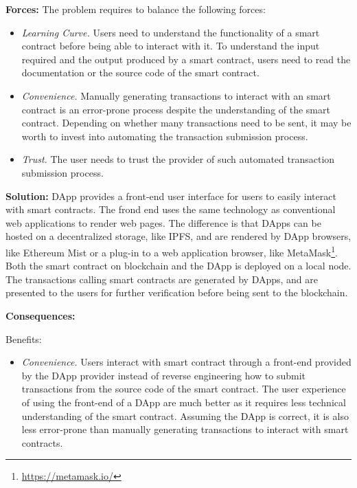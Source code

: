\vspace{0.5em}\noindent \textbf{Forces:} 
The problem requires to balance the following forces:
\begin{itemize}
  \item \textit{Learning Curve.} Users need to understand the functionality of a smart contract before being able to interact with it. To understand the input required and the output produced by a smart contract, users need to read the documentation or the source code of the smart contract. 
  \item \textit{Convenience.} Manually generating transactions to interact with an smart contract is an error-prone process despite the understanding of the smart contract. Depending on whether many transactions need to be sent, it may be worth to invest into automating the transaction submission process.
  \item \textit{Trust.} The user needs to trust the provider of such automated transaction submission process.  
\end{itemize}

\vspace{0.5em}\noindent \textbf{Solution:} 
DApp provides a front-end user interface for users to easily interact with smart contracts. The frond end uses the same technology as conventional web applications to render web pages. The difference is that DApps can be hosted on a decentralized storage, like IPFS, and are rendered by DApp browsers, like Ethereum Mist or a plug-in to a web application browser, like MetaMask\footnote{\url{https://metamask.io/}}. Both the smart contract on blockchain and the DApp is deployed on a local node.  The transactions calling smart contracts are generated by DApps, and are presented to the users for further verification before being sent to the blockchain.  


\vspace{0.5em}\noindent \textbf{Consequences:} 

Benefits:
\begin{itemize}
  \item \textit{Convenience.} Users interact with smart contract through a front-end provided by the DApp provider instead of reverse engineering how to submit transactions from the source code of the smart contract. The user experience of using the front-end of a DApp are much better as it requires less technical understanding of the smart contract. Assuming the DApp is correct, it is also less error-prone than manually generating transactions to interact with smart contracts.
\end{itemize}

